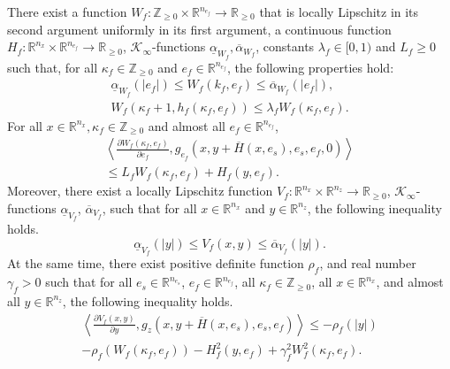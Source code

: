 \begin{assum}
There exist a function ${W_f}: \mathbb{Z}_{\geq 0}\times \mathbb{R}^{n_{e_f}} \to \mathbb{R}_{\geq 0}$ that is locally Lipschitz in its second argument uniformly in its first argument, a continuous function $H_f : \mathbb{R}^{n_x}\times\mathbb{R}^{n_{e_f}} \rightarrow \mathbb{R}_{\geq 0} $, $\mathcal{K}_{\infty}$-functions $ \underline{\alpha}_{W_f},\overline{\alpha }_{W_f}  $, constants $\lambda_f \in [0,1)$ and $ L_f \geq 0$ such that, for all $ \kappa_f \in \mathbb{Z}_{\geq 0}$ and $e_f \in \mathbb{R}^{n_{e_f}}$, the following properties hold:
\begin{align}
   \underline{\alpha}_{W_f}\left(\left|  {e_f}  \right|\right) \leq {W_f}(k_f, {e_f}) \leq \overline{\alpha }_{W_f}\left(\left|   {e_f}  \right|\right) ,\label{eqn: NCS assumption Wf sandwich bound}
    \\
    {W_f}(\kappa_f + 1, h_f(\kappa_f, e_f)) \leq \lambda_f {W_f}(\kappa_f, {e_f}). \label{eqn: NCS assumption Wf jump}
\end{align}
For all $x \in \mathbb{R}^{n_x}, \kappa_f \in \mathbb{Z}_{\geq 0}$ and almost all ${e_f} \in \mathbb{R}^{n_{e_f}}$,
\begin{multline}
   \left< \tfrac{\partial {W_f}(\kappa_f,{e_f})}{\partial {e_f}}, g_{e_f}(x,y+  \overline{H}(x, e_s),e_s,e_f, 0)\right>
    \\
     \leq  L_f {W_f}(\kappa_f, e_f) + H_f(y,e_f).
    \label{eqn: NCS Wf dot}
\end{multline}  
%
Moreover, there exist a locally Lipschitz function ${V_f}: \mathbb{R}^{n_x}\times \mathbb{R}^{n_z} \to \mathbb{R}_{\geq 0}$, $\mathcal{K}_\infty$-functions $\underline{\alpha}_{V_f}$, $\overline{\alpha}_{V_f}$, such that for all $x \in \mathbb{R}^{n_x}$ and $y\in \mathbb{R}^{n_z}$, the following inequality holds. 
\begin{equation}
    \underline{\alpha}_{V_f}\left(\left|  y \right|\right) \leq {V_f}(x, y) \leq \overline{\alpha }_{V_f}\left(\left|   y  \right|\right). \label{eqn: Vf sandwich bound}
\end{equation}
At the same time, there exist positive definite function $\rho_f $, and real number $\gamma_f > 0$ such that for all $e_s \in \mathbb{R}^{n_{e_s}}$, $e_f \in \mathbb{R}^{n_{e_f}}$, all $\kappa_f \in \mathbb{Z}_{\geq 0}$, all $x\in \mathbb{R}^{n_x}$, and almost all $y\in \mathbb{R}^{n_z}$, the following inequality holds.
%
\begin{multline}
        \left< \tfrac{\partial {V_f}(x,y)}{\partial y},g_z(x,y+ \overline{H}(x, e_s),e_s,e_f)  \right>\leq - \rho_f(|y|) 
            \\
             - \rho_f\left(W_f(\kappa_f, e_f)\right) - H_f^2(y,e_f) 
             + \gamma_f^2 W_f^2(\kappa_f,e_f). \!\!\!\!
             \label{eqn: NCS Vf flow}
\end{multline}
\vspace{-0.5cm}
\label{Assumption boundary layer system}
\end{assum}
